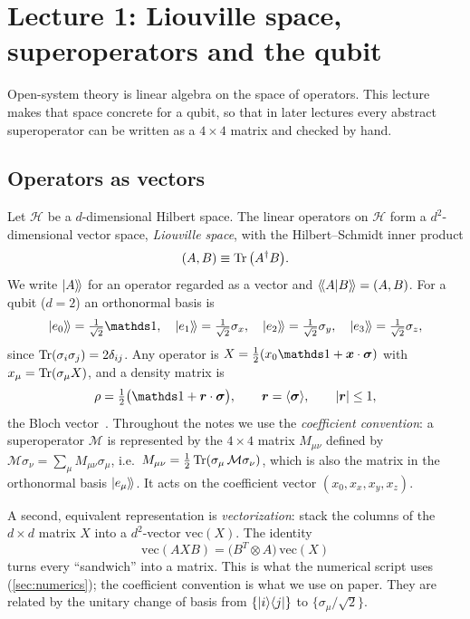 \section{Lecture 1: Liouville space, superoperators and the qubit}
\label{sec:lec1}

Open-system theory is linear algebra on the space of operators.
This lecture makes that space concrete for a qubit, so that in later lectures every abstract superoperator can be written as a $4\times4$ matrix and checked by hand.

\subsection{Operators as vectors}

Let $\mathcal H$ be a $d$-dimensional Hilbert space.
The linear operators on $\mathcal H$ form a $d^2$-dimensional vector space, \emph{Liouville space}, with the Hilbert--Schmidt inner product
\begin{equation}
  (A,B)\equiv\operatorname{Tr}\big(A^\dagger B\big).
  \label{eq:HS}
\end{equation}
We write $|A\rangle\!\rangle$ for an operator regarded as a vector and $\langle\!\langle A|B\rangle\!\rangle=(A,B)$.
For a qubit ($d=2$) an orthonormal basis is
\begin{equation}
  \kket{e_0}=\tfrac{1}{\sqrt2}\Id,\quad \kket{e_1}=\tfrac{1}{\sqrt2}\sx,\quad
  \kket{e_2}=\tfrac{1}{\sqrt2}\sy,\quad \kket{e_3}=\tfrac{1}{\sqrt2}\sz ,
\end{equation}
since $\operatorname{Tr}(\sigma_i\sigma_j)=2\delta_{ij}$.
Any operator is $X=\tfrac12(x_0\Id+\bm x\cdot\bm\sigma)$ with $x_\mu=\operatorname{Tr}(\sigma_\mu X)$, and a density matrix is
\begin{equation}
  \rho=\tfrac12\big(\Id+\bm r\cdot\bm\sigma\big),\qquad \bm r=\avg{\bm\sigma},\qquad |\bm r|\le1 ,
  \label{eq:bloch}
\end{equation}
the Bloch vector~\cite{Bloch1946}.
Throughout the notes we use the \emph{coefficient convention}: a superoperator $\mathcal M$ is represented by the $4\times4$ matrix $M_{\mu\nu}$ defined by $\mathcal M\sigma_\nu=\sum_\mu M_{\mu\nu}\sigma_\mu$, i.e.\ $M_{\mu\nu}=\tfrac12\operatorname{Tr}(\sigma_\mu\,\mathcal M\sigma_\nu)$, which is also the matrix in the orthonormal basis $|e_\mu\rangle\!\rangle$.
It acts on the coefficient vector $(x_0,x_x,x_y,x_z)$.

A second, equivalent representation is \emph{vectorization}: stack the columns of the $d\times d$ matrix $X$ into a $d^2$-vector $\mathrm{vec}(X)$.
The identity
\begin{equation}
  \mathrm{vec}(AXB)=\big(B^{T}\otimes A\big)\,\mathrm{vec}(X)
  \label{eq:vec}
\end{equation}
turns every ``sandwich'' into a matrix.
This is what the numerical script uses (\cref{sec:numerics}); the coefficient convention is what we use on paper.
They are related by the unitary change of basis from $\{|i\rangle\langle j|\}$ to $\{\sigma_\mu/\sqrt2\}$.

